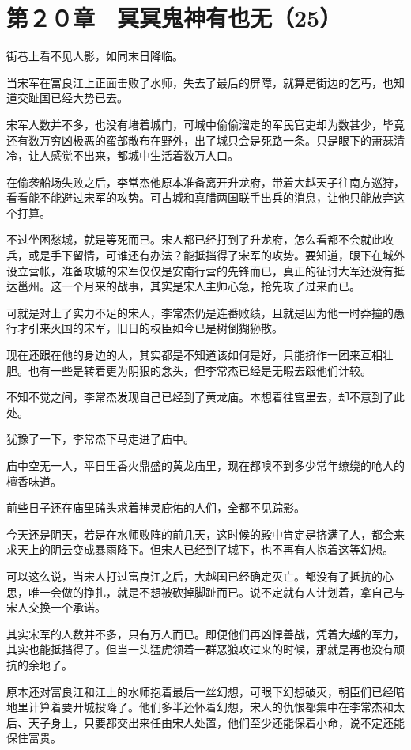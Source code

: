 \section{第２０章　冥冥鬼神有也无（25）}

街巷上看不见人影，如同末日降临。

当宋军在富良江上正面击败了水师，失去了最后的屏障，就算是街边的乞丐，也知道交趾国已经大势已去。

宋军人数并不多，也没有堵着城门，可城中偷偷溜走的军民官吏却为数甚少，毕竟还有数万穷凶极恶的蛮部散布在野外，出了城只会是死路一条。只是眼下的萧瑟清冷，让人感觉不出来，都城中生活着数万人口。

在偷袭船场失败之后，李常杰他原本准备离开升龙府，带着大越天子往南方巡狩，看看能不能避过宋军的攻势。可占城和真腊两国联手出兵的消息，让他只能放弃这个打算。

不过坐困愁城，就是等死而已。宋人都已经打到了升龙府，怎么看都不会就此收兵，或是手下留情，可谁还有办法？能抵挡得了宋军的攻势。要知道，眼下在城外设立营帐，准备攻城的宋军仅仅是安南行营的先锋而已，真正的征讨大军还没有抵达邕州。这一个月来的战事，其实是宋人主帅心急，抢先攻了过来而已。

可就是对上了实力不足的宋人，李常杰仍是连番败绩，且就是因为他一时莽撞的愚行才引来灭国的宋军，旧日的权臣如今已是树倒猢狲散。

现在还跟在他的身边的人，其实都是不知道该如何是好，只能挤作一团来互相壮胆。也有一些是转着更为阴狠的念头，但李常杰已经是无暇去跟他们计较。

不知不觉之间，李常杰发现自己已经到了黄龙庙。本想着往宫里去，却不意到了此处。

犹豫了一下，李常杰下马走进了庙中。

庙中空无一人，平日里香火鼎盛的黄龙庙里，现在都嗅不到多少常年缭绕的呛人的檀香味道。

前些日子还在庙里磕头求着神灵庇佑的人们，全都不见踪影。

今天还是阴天，若是在水师败阵的前几天，这时候的殿中肯定是挤满了人，都会来求天上的阴云变成暴雨降下。但宋人已经到了城下，也不再有人抱着这等幻想。

可以这么说，当宋人打过富良江之后，大越国已经确定灭亡。都没有了抵抗的心思，唯一会做的挣扎，就是不想被砍掉脚趾而已。说不定就有人计划着，拿自己与宋人交换一个承诺。

其实宋军的人数并不多，只有万人而已。即便他们再凶悍善战，凭着大越的军力，其实也能抵挡得了。但当一头猛虎领着一群恶狼攻过来的时候，那就是再也没有顽抗的余地了。

原本还对富良江和江上的水师抱着最后一丝幻想，可眼下幻想破灭，朝臣们已经暗地里计算着要开城投降了。他们多半还怀着幻想，宋人的仇恨都集中在李常杰和太后、天子身上，只要都交出来任由宋人处置，他们至少还能保着小命，说不定还能保住富贵。

